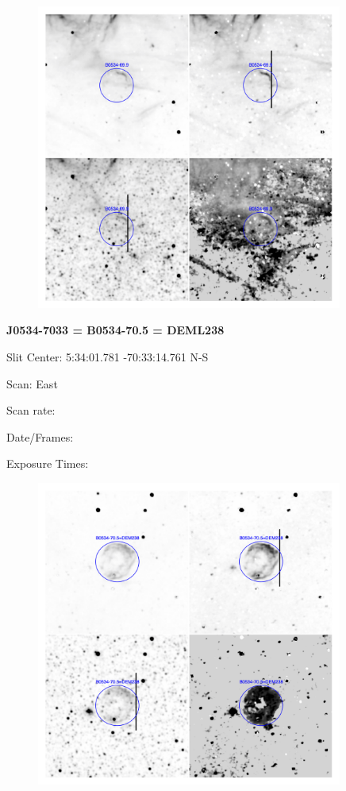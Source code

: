 \documentclass[11pt]{article}
\begin{document}
\begin{figure}
\includegraphics[width=10.05cm]{snapshots/B0534-699.png}
\end{figure}

\newpage
{\bf J0534-7033 = B0534-70.5 = DEML238}  
 
Slit Center:   5:34:01.781 -70:33:14.761  N-S

Scan:  East

Scan rate:  

Date/Frames:

Exposure Times:  

\begin{figure}
\includegraphics[width=10.05cm]{snapshots/B0534-705.png}
\end{figure}
\end{document}
